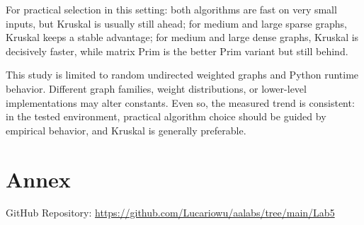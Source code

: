 \documentclass{labreport}
\begin{document}
For practical selection in this setting: both algorithms are fast on very small inputs, but Kruskal is usually still ahead; for medium and large sparse graphs, Kruskal keeps a stable advantage; for medium and large dense graphs, Kruskal is decisively faster, while matrix Prim is the better Prim variant but still behind.

This study is limited to random undirected weighted graphs and Python runtime behavior. Different graph families, weight distributions, or lower-level implementations may alter constants. Even so, the measured trend is consistent: in the tested environment, practical algorithm choice should be guided by empirical behavior, and Kruskal is generally preferable.

\newpage

\section{Annex}

GitHub Repository: \url{https://github.com/Lucariowu/aalabs/tree/main/Lab5}
\end{document}
